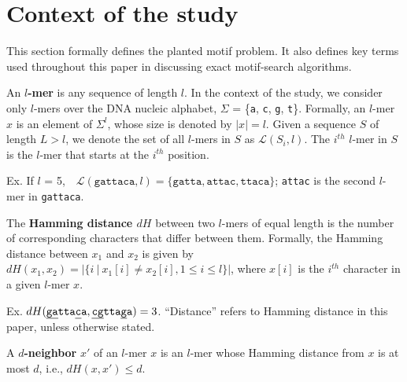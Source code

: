 \documentclass[oneside,12pt]{DISCSthesis}
\begin{document}
	\section{Context of the study}
		This section formally defines the planted motif problem. It also defines key terms used throughout this paper in discussing exact motif-search algorithms.\vspace{5mm}


		\noindent An \textbf{\boldmath $l$-mer} is any sequence of length $l$. In the context of the study, we consider only $l$-mers over the DNA nucleic alphabet, $\Sigma$ = \{\texttt{a}, \texttt{c}, \texttt{g}, \texttt{t}\}. Formally, an $l$-mer $x$ is an element of $\Sigma^l$, whose size is denoted by $|x| = l$. Given a sequence $S$ of length $L > l$, we denote the set of all $l$-mers in $S$ as $\mathcal{L}(S_i, l)$. The $i^{th}$ $l$-mer in $S$ is the $l$-mer that starts at the $i^{th}$ position.

		\noindent \hspace*{35pt} Ex. If $l$ = 5,\ \ $\mathcal{L}(\texttt{gattaca}, l)= \{\texttt{gatta},\texttt{attac},\texttt{ttaca}\}$;
		\newline\hspace*{55pt}	\texttt{attac} is the second $l$-mer in \texttt{gattaca}.\newline


		\noindent The \textbf{\boldmath Hamming distance $dH$} between two $l$-mers of equal length is the number of corresponding characters that differ between them. Formally, the Hamming distance between $x_1$ and $x_2$ is given by $ dH(x_1, x_2) = | \{i\ |\ x_1[i] \neq x_2[i], 1 \leq i \leq l\} |$, where $x[i]$ is the $i^{th}$ character in a given $l$-mer $x$.

		\noindent \hspace*{35pt} Ex. $dH(\texttt{\ul{ga}tta\ul{c}a}, \texttt{\ul{cg}tta\ul{g}a}) = 3$. \newline
		\noindent ``Distance'' refers to Hamming distance in this paper, unless otherwise stated.\newline

		
		\noindent A {\boldmath\bf $d$-neighbor} $x'$ of an $l$-mer $x$ is an $l$-mer whose Hamming distance from $x$ is at most $d$, i.e., {\boldmath $dH (x, x') \leq d$}.
\end{document}
